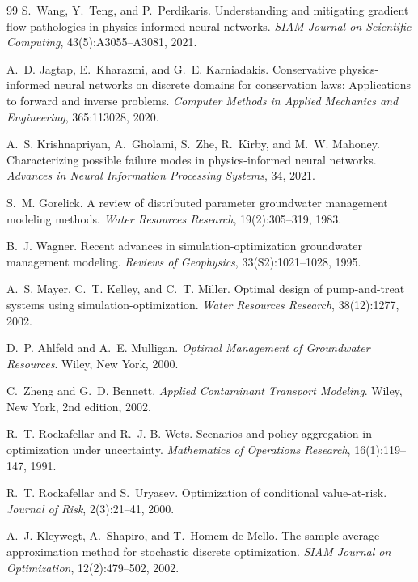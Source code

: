 \documentclass[11pt]{article}
\begin{document}
\begin{thebibliography}{99}
S.~Wang, Y.~Teng, and P.~Perdikaris.
Understanding and mitigating gradient flow pathologies in physics-informed
neural networks.
\textit{SIAM Journal on Scientific Computing}, 43(5):A3055--A3081, 2021.

A.~D. Jagtap, E.~Kharazmi, and G.~E. Karniadakis.
Conservative physics-informed neural networks on discrete domains for
conservation laws: Applications to forward and inverse problems.
\textit{Computer Methods in Applied Mechanics and Engineering},
365:113028, 2020.

A.~S. Krishnapriyan, A.~Gholami, S.~Zhe, R.~Kirby, and M.~W. Mahoney.
Characterizing possible failure modes in physics-informed neural networks.
\textit{Advances in Neural Information Processing Systems}, 34, 2021.

S.~M. Gorelick.
A review of distributed parameter groundwater management modeling methods.
\textit{Water Resources Research}, 19(2):305--319, 1983.

B.~J. Wagner.
Recent advances in simulation-optimization groundwater management modeling.
\textit{Reviews of Geophysics}, 33(S2):1021--1028, 1995.

A.~S. Mayer, C.~T. Kelley, and C.~T. Miller.
Optimal design of pump-and-treat systems using simulation-optimization.
\textit{Water Resources Research}, 38(12):1277, 2002.

D.~P. Ahlfeld and A.~E. Mulligan.
\textit{Optimal Management of Groundwater Resources}.
Wiley, New York, 2000.

C.~Zheng and G.~D. Bennett.
\textit{Applied Contaminant Transport Modeling}.
Wiley, New York, 2nd edition, 2002.

R.~T. Rockafellar and R.~J.-B. Wets.
Scenarios and policy aggregation in optimization under uncertainty.
\textit{Mathematics of Operations Research}, 16(1):119--147, 1991.

R.~T. Rockafellar and S.~Uryasev.
Optimization of conditional value-at-risk.
\textit{Journal of Risk}, 2(3):21--41, 2000.

A.~J. Kleywegt, A.~Shapiro, and T.~Homem-de-Mello.
The sample average approximation method for stochastic discrete optimization.
\textit{SIAM Journal on Optimization}, 12(2):479--502, 2002.


\end{thebibliography}
\end{document}
